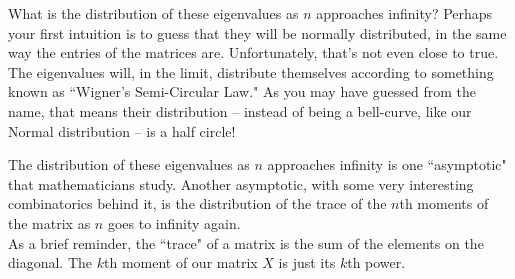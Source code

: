 What is the distribution of these eigenvalues as $n$ approaches infinity? Perhaps your first intuition is to guess that they will be normally distributed, in the same way the entries of the matrices are. Unfortunately, that's not even close to true. The eigenvalues will, in the limit, distribute themselves according to something known as ``Wigner's Semi-Circular Law." As you may have guessed from the name, that means their distribution -- instead of being a bell-curve, like our Normal distribution -- is a half circle! \\

 \vspace{0.2cm}

The distribution of these eigenvalues as $n$ approaches infinity is one ``asymptotic" that mathematicians study. Another asymptotic, with some very interesting combinatorics behind it, is the distribution of the trace of the $n$th moments of the matrix as $n$ goes to infinity again. \\ 

As a brief reminder, the ``trace" of a matrix is the sum of the elements on the diagonal. The $k$th moment of our matrix $X$ is just its $k$th power. \\

